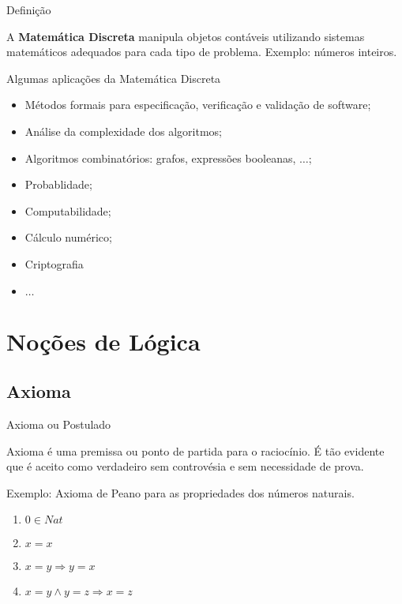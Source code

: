\begin{frame}{Definição}

  A {\bf Matemática Discreta} manipula objetos \alert{contáveis} utilizando
  sistemas matemáticos adequados para cada tipo de problema. 
  Exemplo: números inteiros.
  
\end{frame}

\begin{frame}{Algumas aplicações da Matemática Discreta}

  \begin{itemize}[<+-| alert@+>]

  \item Métodos formais para especificação, verificação e validação de
    software;
  \item Análise da complexidade dos algoritmos;
  \item Algoritmos combinatórios: grafos, expressões booleanas, $\dots$;
  \item Probablidade;
  \item Computabilidade;
  \item Cálculo numérico;
  \item Criptografia
  \item $\dots$
  \end{itemize}
  
\end{frame}

\section{Noções de Lógica}


\subsection{Axioma}

\begin{frame}{Axioma ou Postulado}

\alert{Axioma} é uma premissa ou ponto de partida para o raciocínio. 
É tão evidente que é aceito como verdadeiro sem controvésia e sem necessidade 
de prova.

\bigskip
{}
Exemplo: Axioma de Peano para as propriedades dos números naturais.

\begin{enumerate}
\item $0 \in Nat$
\item $x=x$
\item $x=y \Rightarrow y=x$
\item $x=y\wedge y=z\Rightarrow x=z$
\end{enumerate}
  
\end{frame}


